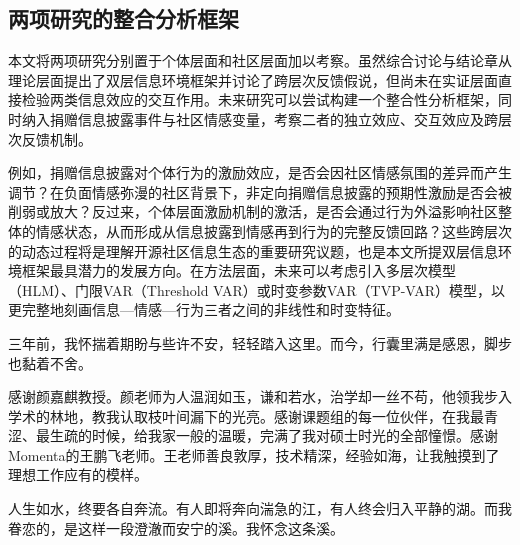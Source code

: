 \documentclass[
    type = master, %
    degree = professional,        %
    decl-page,  %
    twoside,                %
    fontset = fandol %
  ]{njuthesis}
\begin{document}
\subsection{两项研究的整合分析框架}

本文将两项研究分别置于个体层面和社区层面加以考察。虽然综合讨论与结论章从理论层面提出了双层信息环境框架并讨论了跨层次反馈假说，但尚未在实证层面直接检验两类信息效应的交互作用。未来研究可以尝试构建一个整合性分析框架，同时纳入捐赠信息披露事件与社区情感变量，考察二者的独立效应、交互效应及跨层次反馈机制。

例如，捐赠信息披露对个体行为的激励效应，是否会因社区情感氛围的差异而产生调节？在负面情感弥漫的社区背景下，非定向捐赠信息披露的预期性激励是否会被削弱或放大？反过来，个体层面激励机制的激活，是否会通过行为外溢影响社区整体的情感状态，从而形成从信息披露到情感再到行为的完整反馈回路？这些跨层次的动态过程将是理解开源社区信息生态的重要研究议题，也是本文所提双层信息环境框架最具潜力的发展方向。在方法层面，未来可以考虑引入多层次模型（HLM）、门限VAR（Threshold VAR）或时变参数VAR（TVP-VAR）模型，以更完整地刻画信息—情感—行为三者之间的非线性和时变特征。



\printbibliography


\begin{acknowledgement}
三年前，我怀揣着期盼与些许不安，轻轻踏入这里。而今，行囊里满是感恩，脚步也黏着不舍。

感谢颜嘉麒教授。颜老师为人温润如玉，谦和若水，治学却一丝不苟，他领我步入学术的林地，教我认取枝叶间漏下的光亮。感谢课题组的每一位伙伴，在我最青涩、最生疏的时候，给我家一般的温暖，完满了我对硕士时光的全部憧憬。感谢Momenta的王鹏飞老师。王老师善良敦厚，技术精深，经验如海，让我触摸到了理想工作应有的模样。

人生如水，终要各自奔流。有人即将奔向湍急的江，有人终会归入平静的湖。而我眷恋的，是这样一段澄澈而安宁的溪。我怀念这条溪。
\end{acknowledgement}


\appendix
\end{document}
